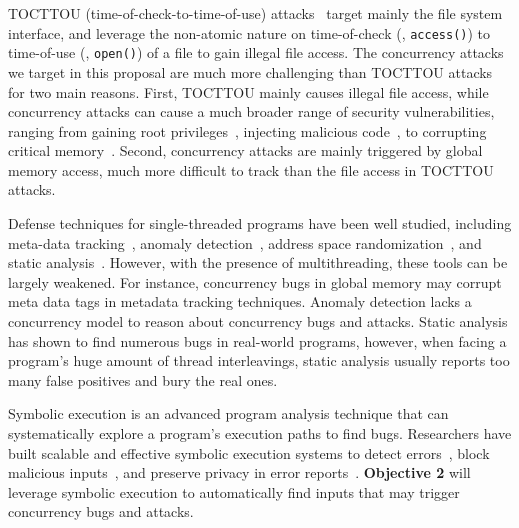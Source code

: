  TOCTTOU (time-of-check-to-time-of-use) 
attacks~\cite{bishop:tocttou,toctou:fast08,toctou:fast05,toctou:usec03} target 
mainly the file system interface, and leverage the non-atomic nature on 
time-of-check (\eg, \texttt{access()}) to time-of-use (\eg, \texttt{open()}) of 
a file to gain illegal file access. The concurrency attacks we target in this 
proposal are much more challenging than TOCTTOU attacks for two main reasons. 
First, TOCTTOU mainly causes illegal file access, while concurrency attacks can 
cause a much broader range of security vulnerabilities, ranging from gaining 
root privileges~\cite{uselib-bug-12791}, injecting malicious 
code~\cite{uselib-bug-12791}, to corrupting 
critical memory~\cite{apache-bug-25520}. Second, concurrency attacks are mainly 
triggered by global memory access, much more difficult to track than the file 
access in TOCTTOU attacks.

 Defense techniques for 
single-threaded programs have been well studied, including meta-data 
tracking~\cite{taintdroid:osdi10, lift:micro06, myers:information, 
valgrind:pldi}, anomaly 
detection~\cite{taskrecycling:ppopp90,schonberg:pldi89}, address space 
randomization~\cite{ aslr-fail:ccs04}, and static 
analysis~\cite{seth:pldi,engler:vmcai,wagner:syscall:ids,coverity:cacm, 
klee:osdi08}. However, with the presence of 
multithreading, these tools can be largely weakened. For instance, concurrency 
bugs in global memory may corrupt meta data tags in metadata tracking 
techniques. Anomaly detection lacks a concurrency model to reason about 
concurrency bugs and attacks. Static analysis has shown to find numerous bugs in 
real-world programs, however, when facing a program's huge amount of thread 
interleavings, static analysis usually reports too many false positives and bury 
the real ones.

 Symbolic execution is an advanced program 
analysis technique that can systematically explore a program's execution paths 
to find bugs.  Researchers have built
scalable and effective symbolic execution systems to detect
errors~\cite{dart:pldi,cute:fse,godefroid:grammar-fuzzing,
godefroid:whitebox-fuzzing,
klee:osdi08,yang:malicious-disk:oakland06,cadar:exe:ccs06,s2e:hotdep09,
taas:socc10}, block malicious inputs~\cite{castro:bouncer}, and preserve 
privacy in error reports~\cite{castro:bug-report-privacy}. 
\textbf{Objective 2} will leverage symbolic execution to automatically find 
inputs that may trigger concurrency bugs and attacks.

